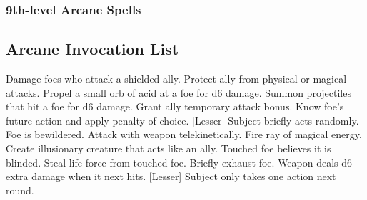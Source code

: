 \subsubsection{9th-level Arcane Spells} 
\begin{swspelllist}

    \SLmagesdisjunction[Abjur]
    \SLprohibitiongreater*

    \SLimprisonment[Conj]
    \SLshadowpuppet
    \SLsummonmonsterix
    \SLetherealness*

    \SLforesightgreater[Div]
    \SLrevelation
    \SLmomentofpresciencegreater*

    \SLholdmonster[Ench]
    \SLirresistibledance
    \SLweird
    \SLdominatemonster*

    \SLmeteorswarm[Evoc]
    \SLclenchedfist*

    \SLshadowpuppet[Illus]
    \SLweird
    \SLfalsereality*

    \SLassimilate[Necro]
    \SLpowerwordkill
    \SLwailofthebanshee*

    \SLassimilate[Trans]
    \SLtransmuteanyobject
    \SLimprisonment
    \SLtimestop*

    \SLprismaticstorm[Univ]
\end{swspelllist}

\subsection{Arcane Invocation List}
\begin{swspelllist}
     Damage foes who attack a shielded ally.
     Protect ally from physical or magical attacks.
     Propel a small orb of acid at a foe for d6 damage.
     Summon projectiles that hit a foe for d6 damage.
     Grant ally temporary attack bonus.
     Know foe's future action and apply penalty of choice.
    [Lesser] Subject briefly acts randomly.
     Foe is bewildered.
     Attack with weapon telekinetically.
     Fire ray of magical energy.
     Create illusionary creature that acts like an ally.
     Touched foe believes it is blinded.
     Steal life force from touched foe.
     Briefly exhaust foe.
     Weapon deals d6 extra damage when it next hits.
    [Lesser] Subject only takes one action next round.
\end{swspelllist}

